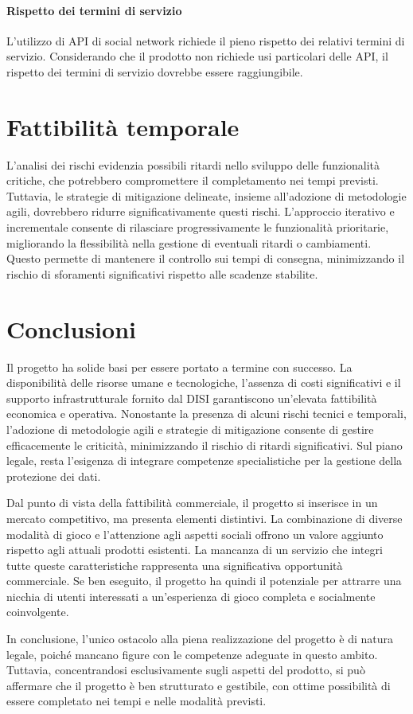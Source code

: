 \documentclass[12pt,a4paper]{report}
\begin{document}
\paragraph{Rispetto dei termini di servizio}
L'utilizzo di API di social network richiede il pieno rispetto dei relativi termini di servizio. Considerando che il prodotto non richiede usi particolari delle API, il rispetto dei termini di servizio dovrebbe essere raggiungibile.

\section{Fattibilità temporale}
L'analisi dei rischi evidenzia possibili ritardi nello sviluppo delle funzionalità critiche, che potrebbero compromettere il completamento nei tempi previsti. Tuttavia, le strategie di mitigazione delineate, insieme all'adozione di metodologie agili, dovrebbero ridurre significativamente questi rischi. L'approccio iterativo e incrementale consente di rilasciare progressivamente le funzionalità prioritarie, migliorando la flessibilità nella gestione di eventuali ritardi o cambiamenti. Questo permette di mantenere il controllo sui tempi di consegna, minimizzando il rischio di sforamenti significativi rispetto alle scadenze stabilite.

\section{Conclusioni}
Il progetto ha solide basi per essere portato a termine con successo. La disponibilità delle risorse umane e tecnologiche, l'assenza di costi significativi e il supporto infrastrutturale fornito dal DISI garantiscono un'elevata fattibilità economica e operativa. Nonostante la presenza di alcuni rischi tecnici e temporali, l'adozione di metodologie agili e strategie di mitigazione consente di gestire efficacemente le criticità, minimizzando il rischio di ritardi significativi. Sul piano legale, resta l'esigenza di integrare competenze specialistiche per la gestione della protezione dei dati.

Dal punto di vista della fattibilità commerciale, il progetto si inserisce in un mercato competitivo, ma presenta elementi distintivi. La combinazione di diverse modalità di gioco e l'attenzione agli aspetti sociali offrono un valore aggiunto rispetto agli attuali prodotti esistenti. La mancanza di un servizio che integri tutte queste caratteristiche rappresenta una significativa opportunità commerciale. Se ben eseguito, il progetto ha quindi il potenziale per attrarre una nicchia di utenti interessati a un'esperienza di gioco completa e socialmente coinvolgente.

In conclusione, l'unico ostacolo alla piena realizzazione del progetto è di natura legale, poiché mancano figure con le competenze adeguate in questo ambito. Tuttavia, concentrandosi esclusivamente sugli aspetti del prodotto, si può affermare che il progetto è ben strutturato e gestibile, con ottime possibilità di essere completato nei tempi e nelle modalità previsti.
\end{document}
